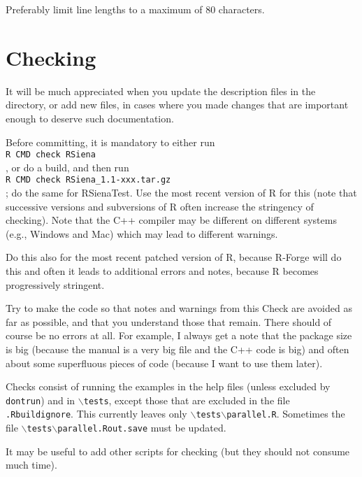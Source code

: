 \documentclass[12pt, a4paper]{article}
\renewcommand{\=}{\,=\,}
\newcommand{\+}{\,+\,}
\newcommand{\bs}{\backslash}
\newcommand{\rst}{{\sf RSienaTest}}
\begin{document}
Preferably limit line lengths to a maximum of 80 characters.

\section{Checking}


 It will be much appreciated when you update the description files in
 the  directory, or add new files, in cases where you made changes that are
 important enough to deserve such documentation.

  Before committing, it is mandatory to either run \\
  \verb|R CMD check RSiena|\\
  , or do a build, and then run \\
  \verb|R CMD check RSiena_1.1-xxx.tar.gz|\\
  ; do the same for \rst.
  Use the most recent version of R for this (note that
  successive versions and subversions of R often increase the stringency of checking).
  Note that the C++ compiler may be different on different systems (e.g., Windows and Mac)
  which may lead to different warnings.
  
  Do this also for the most recent patched version of R, because R-Forge will do this
  and often it leads to additional errors and notes, because R becomes progressively
  stringent.

  Try to make the code so that notes and warnings from this Check are avoided as far as possible,
  and that you understand those that remain.
  There should of course be no errors at all.
  For example, I always get a note that the package size is big
  (because the manual is a very big file and the C++ code is big) and
  often about some superfluous pieces of code (because I want to use them later).

  Checks consist of running the examples in the help files (unless excluded by \texttt{dontrun})
  and in \texttt{$\bs$tests}, except those that are excluded in the file \texttt{.Rbuildignore}.
  This currently leaves only \texttt{$\bs$tests$\bs$parallel.R}.
  Sometimes the file \texttt{$\bs$tests$\bs$parallel.Rout.save} must be updated.

  It may be useful to add other scripts for checking (but they should not consume much time).
\end{document}

